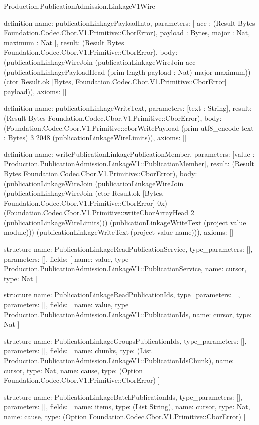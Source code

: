 \begin{lexlean}{Production.PublicationAdmission.LinkageV1Wire}
\begin{semanticmodule}
definition{
  name: publicationLinkagePayloadInto,
  parameters: [
    acc : (Result Bytes Foundation.Codec.Cbor.V1.Primitive::CborError),
    payload : Bytes,
    major : Nat,
    maximum : Nat
  ],
  result: (Result Bytes Foundation.Codec.Cbor.V1.Primitive::CborError),
  body: (publicationLinkageWireJoin (publicationLinkageWireJoin acc (publicationLinkagePayloadHead (prim length payload : Nat) major maximum)) (ctor Result.ok [Bytes, Foundation.Codec.Cbor.V1.Primitive::CborError] payload)),
  axioms: []
}

definition{
  name: publicationLinkageWriteText,
  parameters: [text : String],
  result: (Result Bytes Foundation.Codec.Cbor.V1.Primitive::CborError),
  body: (Foundation.Codec.Cbor.V1.Primitive::cborWritePayload (prim utf8_encode text : Bytes) 3 2048 (publicationLinkageWireLimits)),
  axioms: []
}

definition{
  name: writePublicationLinkagePublicationMember,
  parameters: [value : Production.PublicationAdmission.LinkageV1::PublicationMember],
  result: (Result Bytes Foundation.Codec.Cbor.V1.Primitive::CborError),
  body: (publicationLinkageWireJoin (publicationLinkageWireJoin (publicationLinkageWireJoin (ctor Result.ok [Bytes, Foundation.Codec.Cbor.V1.Primitive::CborError] 0x) (Foundation.Codec.Cbor.V1.Primitive::writeCborArrayHead 2 (publicationLinkageWireLimits))) (publicationLinkageWriteText (project value module))) (publicationLinkageWriteText (project value name))),
  axioms: []
}

structure{
  name: PublicationLinkageReadPublicationService,
  type_parameters: [],
  parameters: [],
  fields: [
    {name: value, type: Production.PublicationAdmission.LinkageV1::PublicationService},
    {name: cursor, type: Nat}
  ]
}

structure{
  name: PublicationLinkageReadPublicationIds,
  type_parameters: [],
  parameters: [],
  fields: [
    {name: value, type: Production.PublicationAdmission.LinkageV1::PublicationIds},
    {name: cursor, type: Nat}
  ]
}

structure{
  name: PublicationLinkageGroupsPublicationIds,
  type_parameters: [],
  parameters: [],
  fields: [
    {name: chunks, type: (List Production.PublicationAdmission.LinkageV1::PublicationIdsChunk)},
    {name: cursor, type: Nat},
    {name: cause, type: (Option Foundation.Codec.Cbor.V1.Primitive::CborError)}
  ]
}

structure{
  name: PublicationLinkageBatchPublicationIds,
  type_parameters: [],
  parameters: [],
  fields: [
    {name: items, type: (List String)},
    {name: cursor, type: Nat},
    {name: cause, type: (Option Foundation.Codec.Cbor.V1.Primitive::CborError)}
  ]
}


\end{semanticmodule}
\end{lexlean}
